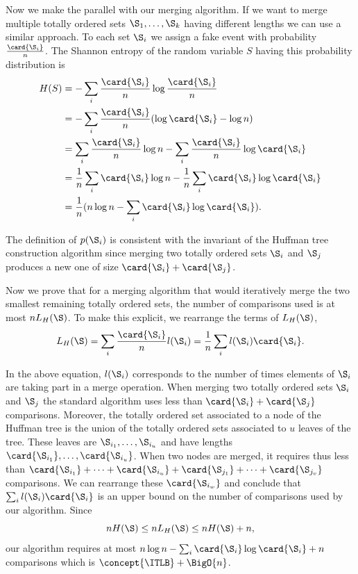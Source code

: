 Now we make the parallel with our merging algorithm. If we want to merge
multiple totally ordered sets \(\S_1,\ldots,\S_k\) having different lengths we can use a similar
approach. To each set \(\S_i\) we assign a fake event with probability
\(\frac{\card{\S_i}}{n}\). The Shannon entropy of the random variable
\(S\) having this probability distribution is
\begin{align*}
H(S) &= - \sum_i \frac{\card{\S_i}}{n} \log \frac{\card{\S_i}}{n}\\
&= - \sum_i \frac{\card{\S_i}}{n} (\log \card{\S_i} - \log n)\\
&= \sum_i \frac{\card{\S_i}}{n} \log n - \sum_i \frac{\card{\S_i}}{n} \log \card{\S_i}\\
&= \frac{1}{n} \sum_i \card{\S_i} \log n - \frac{1}{n} \sum_i \card{\S_i} \log
\card{\S_i}\\
&= \frac{1}{n} (n \log n - \sum_i \card{\S_i} \log \card{\S_i}).
\end{align*}

The definition of \(p(\S_i)\) is consistent with the invariant of
the Huffman tree construction algorithm since merging two totally ordered sets
\(\S_i\) and \(\S_j\) produces a new one of size \(\card{\S_i} + \card{\S_j}\).

Now we prove that for a merging algorithm that would iteratively merge the two
smallest remaining totally ordered sets, the number of comparisons used is at
most \(n L_H(\S)\). To make this explicit, we rearrange the terms of \(L_H(\S)\),
\begin{displaymath}
L_H(\S) = \sum_i \frac{\card{\S_i}}{n} l(\S_i) = \frac{1}{n} \sum_i l(\S_i) \card{\S_i}.
\end{displaymath}

In the above equation, \(l(\S_i)\) corresponds to the number of times elements
of \(\S_i\) are taking part in a merge operation. When merging two totally
ordered sets \(\S_i\) and \(\S_j\) the standard \tapemerge algorithm uses less
than \(\card{\S_i} + \card{\S_j}\) comparisons. Moreover, the totally ordered set
associated to a node of the Huffman tree is the union of the totally ordered
sets associated to \(u\) leaves of the tree. These leaves are
\(\S_{i_1},\ldots,\S_{i_u}\) and have lengths
\(\card{\S_{i_1}},\ldots,\card{\S_{i_u}}\). When two nodes are merged, it
requires thus less than
\(\card{\S_{i_1}}+\cdots+\card{\S_{i_u}}+\card{\S_{j_1}}+\cdots+\card{\S_{j_v}}\)
comparisons. We can rearrange these \(\card{\S_{i_w}}\) and conclude that
\(\sum_i l(\S_i) \card{\S_i}\) is an upper bound on the number of comparisons used
by our algorithm. Since
\begin{displaymath}
n H(\S) \le n L_H(\S) \le n H(\S) + n,
\end{displaymath}
our algorithm requires at most \(n \log n - \sum_i \card{\S_i} \log \card{\S_i} +
n\) comparisons which is \(\concept{\ITLB} + \BigO{n}\).

